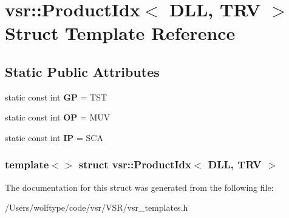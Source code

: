 \hypertarget{structvsr_1_1_product_idx_3_01_d_l_l_00_01_t_r_v_01_4}{\section{vsr\-:\-:Product\-Idx$<$ D\-L\-L, T\-R\-V $>$ Struct Template Reference}
\label{structvsr_1_1_product_idx_3_01_d_l_l_00_01_t_r_v_01_4}
}
\subsection*{Static Public Attributes}
\begin{DoxyCompactItemize}
\item 
\hypertarget{structvsr_1_1_product_idx_3_01_d_l_l_00_01_t_r_v_01_4_a3c2da2d1f84accdf3b6204668aa1513f}{static const int {\bfseries G\-P} = T\-S\-T}\label{structvsr_1_1_product_idx_3_01_d_l_l_00_01_t_r_v_01_4_a3c2da2d1f84accdf3b6204668aa1513f}

\item 
\hypertarget{structvsr_1_1_product_idx_3_01_d_l_l_00_01_t_r_v_01_4_a994f953dc646160a18b774be7776f94b}{static const int {\bfseries O\-P} = M\-U\-V}\label{structvsr_1_1_product_idx_3_01_d_l_l_00_01_t_r_v_01_4_a994f953dc646160a18b774be7776f94b}

\item 
\hypertarget{structvsr_1_1_product_idx_3_01_d_l_l_00_01_t_r_v_01_4_ad989456f0f8a82bf9bb3607bc7c13913}{static const int {\bfseries I\-P} = S\-C\-A}\label{structvsr_1_1_product_idx_3_01_d_l_l_00_01_t_r_v_01_4_ad989456f0f8a82bf9bb3607bc7c13913}

\end{DoxyCompactItemize}
\subsubsection*{template$<$$>$ struct vsr\-::\-Product\-Idx$<$ D\-L\-L, T\-R\-V $>$}



The documentation for this struct was generated from the following file\-:\begin{DoxyCompactItemize}
\item 
/\-Users/wolftype/code/vsr/\-V\-S\-R/vsr\-\_\-templates.\-h\end{DoxyCompactItemize}
